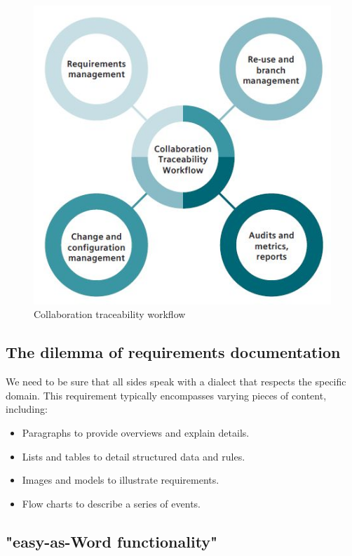 \documentclass[thesis=M,english]{FITthesis}[2012/06/26]
\begin{document}
\begin{figure}[h!]\centering
	\includegraphics[width=1\textwidth]{pictures/collaboration_workflow}
	\caption{Collaboration traceability workflow \cite{polarion_alm}}\label{fig:collaboration_workflow}
\end{figure}

\subsection{The dilemma of requirements documentation}

We need to be sure that all sides speak with a dialect that respects the specific domain. This requirement typically encompasses varying pieces of content, including:
\begin{itemize}[nosep]
	\item Paragraphs to provide overviews and explain details.
	\item Lists and tables to detail structured data and rules.
	\item Images and models to illustrate requirements.
	\item Flow charts to describe a series of events.
\end{itemize}

\subsection{"easy-as-Word functionality"}
\end{document}
